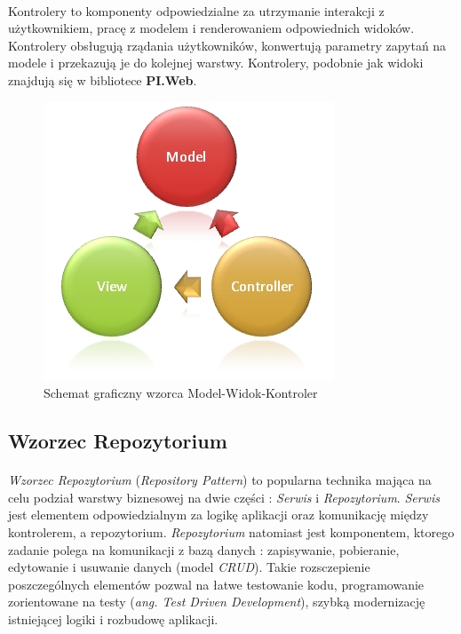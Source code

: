 \paragraph{} 
Kontrolery to komponenty odpowiedzialne za utrzymanie interakcji z użytkownikiem, pracę z modelem i renderowaniem odpowiednich widoków. Kontrolery obsługują rządania użytkowników, konwertują parametry zapytań na modele i przekazują je do kolejnej warstwy. Kontrolery, podobnie jak widoki znajdują się w bibliotece \textbf{PI.Web}.  

\newpage
\begin{figure}[ht]
	\centering
		\includegraphics[width=0.5\linewidth]{assets/03_1.jpg}
	\caption{Schemat graficzny wzorca Model-Widok-Kontroler}
	\label{fig:mvc-pic}
\end{figure}

\subsection{Wzorzec Repozytorium} %
\label{sub:wzorzec_repozytorium}
\paragraph{} %
\label{par:}
\textit{Wzorzec Repozytorium} (\textit{Repository Pattern}) to popularna technika mająca na celu podział warstwy biznesowej na dwie części : \textit{Serwis} i \textit{Repozytorium}. \textit{Serwis} jest elementem odpowiedzialnym za logikę aplikacji oraz komunikację między kontrolerem, a repozytorium. \textit{Repozytorium} natomiast jest komponentem, ktorego zadanie polega na komunikacji z bazą danych : zapisywanie, pobieranie, edytowanie i usuwanie danych (model \textit{CRUD}). Takie rozsczepienie poszczególnych elementów pozwal na łatwe testowanie kodu, programowanie zorientowane na testy (\textit{ang. Test Driven Development}), szybką modernizację istniejącej logiki i rozbudowę aplikacji.

